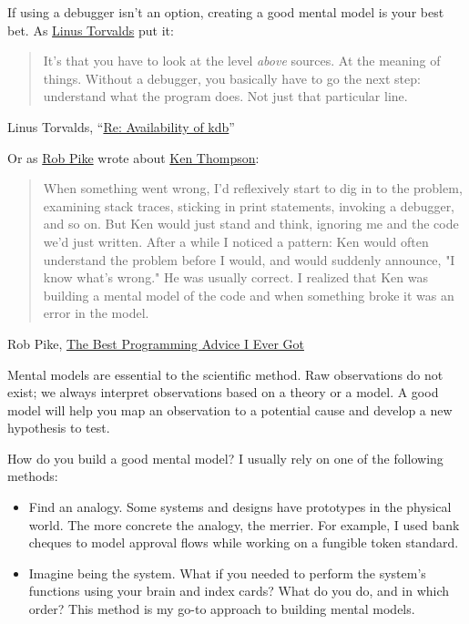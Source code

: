 \documentclass{article}
\begin{document}
If using a debugger isn't an option, creating a good mental model is your best bet.
As \href{https://en.wikipedia.org/wiki/Linus_Torvalds}{Linus Torvalds} put it:
\blockquote{
  It's that you have to look at the level \emph{above} sources.
  At the meaning of things.
  Without a debugger, you basically have to go the next step: understand what the program does.
  Not just that particular line.
}{Linus Torvalds, ``\href{https://lkml.org/lkml/2000/9/6/65}{Re: Availability of kdb}''}

Or as \href{https://en.wikipedia.org/wiki/Rob_Pike}{Rob Pike} wrote about \href{https://en.wikipedia.org/wiki/Ken_Thompson}{Ken Thompson}:

\blockquote{
  When something went wrong, I'd reflexively start to dig in to the problem, examining stack traces, sticking in print statements, invoking a debugger, and so on.
  But Ken would just stand and think, ignoring me and the code we'd just written.
  After a while I noticed a pattern: Ken would often understand the problem before I would, and would suddenly announce, "I know what's wrong."
  He was usually correct.
  I realized that Ken was building a mental model of the code and when something broke it was an error in the model.
}{Rob Pike, \href{https://www.informit.com/articles/article.aspx?p=1941206}{The Best Programming Advice I Ever Got}}

Mental models are essential to the scientific method.
Raw observations do not exist;
we always interpret observations based on a theory or a model.
A good model will help you map an observation to a potential cause and develop a new hypothesis to test.

How do you build a good mental model?
I usually rely on one of the following methods:
\begin{itemize}
\item Find an analogy.
Some systems and designs have prototypes in the physical world.
The more concrete the analogy, the merrier.
For example, I used bank cheques to model approval flows while working on a fungible token standard.
\item Imagine being the system.
What if you needed to perform the system's functions using your brain and index cards?
What do you do, and in which order?
This method is my go-to approach to building mental models.
\end{itemize}
\end{document}
